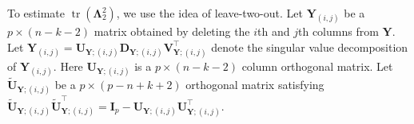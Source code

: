 \documentclass[12pt]{article} %
\DeclareMathOperator{\mytr}{tr}
\DeclareMathOperator{\myE}{E}
\DeclareMathOperator{\myVar}{Var}
\newcommand{\bY}{\mathbf{Y}}
\newcommand{\bI}{\mathbf{I}}
\newcommand{\bU}{\mathbf{U}}
\newcommand{\bD}{\mathbf{D}}
\newcommand{\bV}{\mathbf{V}}
\newcommand{\bfsym}[1]{\ensuremath{\boldsymbol{#1}}}
\def\bLambda {\bfsym {\Lambda}}
\def\bSigma {\bfsym {\Sigma}}
\newtheorem{proposition}{Proposition}
\theoremstyle{definition}
\begin{document}


 To estimate $\mytr(\bLambda_2^2)$,
    we use the idea of leave-two-out.
    Let $\bY_{(i,j)}$ be a $p\times (n-k-2)$ matrix obtained by deleting the $i$th and $j$th columns from $\bY$.
    Let $\bY_{(i,j)}=\bU_{\bY;{(i,j)}}\bD_{\bY;{(i,j)}}\bV_{\bY;{(i,j)}}^\top$ denote the singular value decomposition of $\bY_{(i,j)}$.
    Here $\bU_{\bY;{(i,j)}}$ is a $p\times (n-k-2)$ column orthogonal matrix.
    Let $\tilde{\bU}_{\bY;{(i,j)}}$ be a $p\times (p-n+k+2)$ orthogonal matrix satisfying $\tilde{\bU}_{\bY;{(i,j)}}\tilde{\bU}_{\bY;{(i,j)}}^\top=\bI_{p}-\bU_{\bY;{(i,j)}}\bU_{\bY;{(i,j)}}^\top$.
\end{document}
